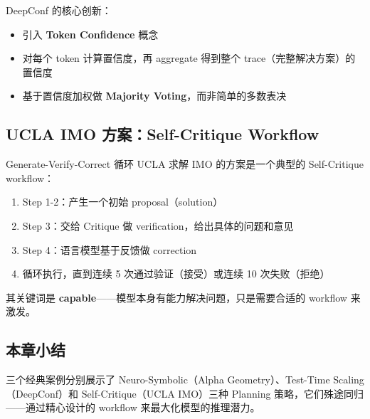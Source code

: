DeepConf 的核心创新：
\begin{itemize}
    \item 引入 \textbf{Token Confidence} 概念
    \item 对每个 token 计算置信度，再 aggregate 得到整个 trace（完整解决方案）的置信度
    \item 基于置信度加权做 \textbf{Majority Voting}，而非简单的多数表决
\end{itemize}

\subsection{UCLA IMO 方案：Self-Critique Workflow}

\begin{importantbox}{Generate-Verify-Correct 循环}
UCLA 求解 IMO 的方案是一个典型的 Self-Critique workflow：
\begin{enumerate}
    \item Step 1-2：产生一个初始 proposal（solution）
    \item Step 3：交给 Critique 做 verification，给出具体的问题和意见
    \item Step 4：语言模型基于反馈做 correction
    \item 循环执行，直到连续 5 次通过验证（接受）或连续 10 次失败（拒绝）
\end{enumerate}
其关键词是 \textbf{capable}——模型本身有能力解决问题，只是需要合适的 workflow 来激发。
\end{importantbox}

\subsection{本章小结}

三个经典案例分别展示了 Neuro-Symbolic（Alpha Geometry）、Test-Time Scaling（DeepConf）和 Self-Critique（UCLA IMO）三种 Planning 策略，它们殊途同归——通过精心设计的 workflow 来最大化模型的推理潜力。


